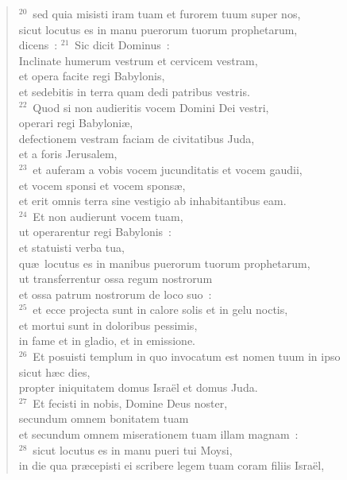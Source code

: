 \begin{flushleft}
\begin{verse}
${}^{20}$~sed quia misisti iram tuam et furorem tuum super nos,\\ sicut locutus es in manu puerorum tuorum prophetarum,\\ dicens~:
${}^{21}$~Sic dicit Dominus~:\\ Inclinate humerum vestrum et cervicem vestram,\\ et opera facite regi Babylonis,\\ et sedebitis in terra quam dedi patribus vestris.\\
${}^{22}$~Quod si non audieritis vocem Domini Dei vestri,\\ operari regi Babyloni\ae ,\\ defectionem vestram faciam de civitatibus Juda,\\ et a foris Jerusalem,\\
${}^{23}$~et auferam a vobis vocem jucunditatis et vocem gaudii,\\ et vocem sponsi et vocem spons\ae ,\\ et erit omnis terra sine vestigio ab inhabitantibus eam.\\
${}^{24}$~Et non audierunt vocem tuam,\\ ut operarentur regi Babylonis~:\\ et statuisti verba tua,\\ qu\ae\ locutus es in manibus puerorum tuorum prophetarum,\\ ut transferrentur ossa regum nostrorum\\ et ossa patrum nostrorum de loco suo~:\\
${}^{25}$~et ecce projecta sunt in calore solis et in gelu noctis,\\ et mortui sunt in doloribus pessimis,\\ in fame et in gladio, et in emissione.\\
${}^{26}$~Et posuisti templum in quo invocatum est nomen tuum in ipso\\ sicut h\ae c dies,\\ propter iniquitatem domus Isra\"el et domus Juda.\\
${}^{27}$~Et fecisti in nobis, Domine Deus noster,\\ secundum omnem bonitatem tuam\\ et secundum omnem miserationem tuam illam magnam~:\\
${}^{28}$~sicut locutus es in manu pueri tui Moysi,\\ in die qua pr\ae cepisti ei scribere legem tuam coram filiis Isra\"el,\\

\end{verse}
\end{flushleft}
